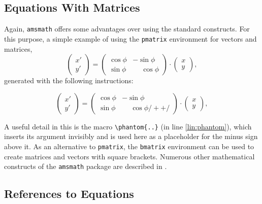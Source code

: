 \subsection{Equations With Matrices}

Again, \texttt{amsmath} offers some advantages over using the standard \latex
constructs. For this purpose, a simple example of using the \texttt{pmatrix}
environment for vectors and matrices,
%
\begin{equation}
	\begin{pmatrix}
		x' \\ y'
	\end{pmatrix}
	=
	\begin{pmatrix}
		\cos \phi & -\sin \phi           \\
		\sin \phi & \phantom{-}\cos \phi
	\end{pmatrix}
	\cdot
	\begin{pmatrix}
		x \\ y
	\end{pmatrix} ,
\end{equation}
%
generated with the following instructions:
%
\begin{LaTeXCode}
\begin{equation}
	\begin{pmatrix} 
			x' \\ 
			y' 
	\end{pmatrix}
	= 
	\begin{pmatrix}
		  \cos \phi &          -\sin \phi \\
		  \sin \phi & \phantom{-}\cos \phi /+ \label{lin:phantom} +/
	\end{pmatrix} 
	\cdot
	\begin{pmatrix} 
			x \\ 
			y 
	\end{pmatrix} ,
\end{equation}
\end{LaTeXCode}
%
A useful detail in this is the \tex macro \verb!\phantom{..}! (in line 
\ref{lin:phantom}), which inserts its argument invisibly and is used here
as a placeholder for the minus sign above it.
As an alternative to \texttt{pmatrix}, the \texttt{bmatrix} environment can
be used to create matrices and vectors with square brackets.
Numerous other mathematical constructs of the \texttt{amsmath} package are
described in \cite{Mittelbach2022}.


\subsection{References to Equations}
\label{sec:ReferencesToEquations}


